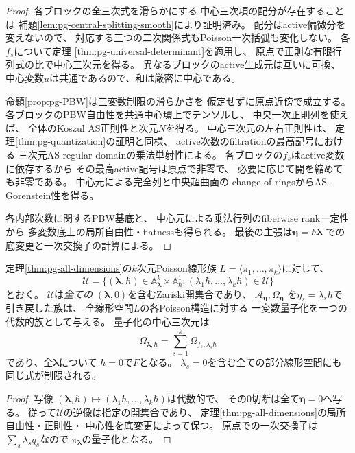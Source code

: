 \begin{proof}
各ブロックの全三次式を滑らかにする
中心三次項の配分が存在することは
補題\ref{lem:pg-central-splitting-smooth}により証明済み。
配分はactive偏微分を変えないので、
対応する三つの二次関係式もPoisson一次括弧も変化しない。
各$f_s$について定理
\ref{thm:pg-universal-determinant}を適用し、
原点で正則な有限行列式の比で中心三次元を得る。
異なるブロックのactive生成元は互いに可換、
中心変数$u$は共通であるので、和は厳密に中心である。

命題\ref{prop:pg-PBW}は三変数制限の滑らかさを
仮定せずに原点近傍で成立する。
各ブロックのPBW自由性を共通中心環上でテンソルし、
中央一次正則列を使えば、
全体のKoszul AS正則性と次元$N$を得る。
中心三次元の左右正則性は、
定理\ref{thm:pg-quantization}の証明と同様、
active次数のfiltrationの最高記号における
三次元AS-regular domainの乗法単射性による。
各ブロックの$f_s$はactive変数に依存するから
その最高active記号は原点で非零で、
必要に応じて開を縮めても非零である。
中心元による完全列と中央超曲面の
change of ringsからAS-Gorenstein性を得る。

各内部次数に関するPBW基底と、
中心元による乗法行列のfiberwise rank一定性から
多変数底上の局所自由性・flatnessも得られる。
最後の主張は$\boldsymbol\eta=\hbar\boldsymbol\lambda$
での底変更と一次交換子の計算による。
\end{proof}

\begin{corollary}[Poisson線形族の零切断近傍での一様量子化]
\label{cor:pg-ad-whole-pencil}
定理\ref{thm:pg-all-dimensions}の$k$次元Poisson線形族
$L=\langle\pi_1,\ldots,\pi_k\rangle$に対して、
\begin{equation}
 \mathscr U=
 \{(\boldsymbol\lambda,\hbar)\in
 \mathbb A^k_{\boldsymbol\lambda}\times\mathbb A^1_\hbar:
 (\lambda_1\hbar,\ldots,\lambda_k\hbar)\in\mathcal U\}
\end{equation}
とおく。
$\mathscr U$は\emph{全ての}
$(\boldsymbol\lambda,0)$を含むZariski開集合であり、
$\mathcal A_{\boldsymbol\eta},\Omega_{\boldsymbol\eta}$
を$\eta_s=\lambda_s\hbar$で引き戻した族は、
全線形空間$L$の各Poisson構造に対する
一変数量子化を一つの代数的族として与える。
量子化の中心三次元は
\begin{equation}
 \Omega_{\boldsymbol\lambda,\hbar}
 =\sum_{s=1}^k\Omega_{f_s,\lambda_s\hbar}
\end{equation}
であり、全$\boldsymbol\lambda$について
$\hbar=0$で$F$となる。
$\lambda_s=0$を含む全ての部分線形空間にも
同じ式が制限される。
\end{corollary}
\begin{proof}
写像
$(\boldsymbol\lambda,\hbar)\mapsto
(\lambda_1\hbar,\ldots,\lambda_k\hbar)$は代数的で、
その$0$切断は全て$\boldsymbol\eta=0$へ写る。
従って$\mathcal U$の逆像は指定の開集合であり、
定理\ref{thm:pg-all-dimensions}の局所自由性・正則性・
中心性を底変更によって保つ。
原点での一次交換子は$\sum_s\lambda_s q_s$なので
$\pi_{\boldsymbol\lambda}$の量子化となる。
\end{proof}

